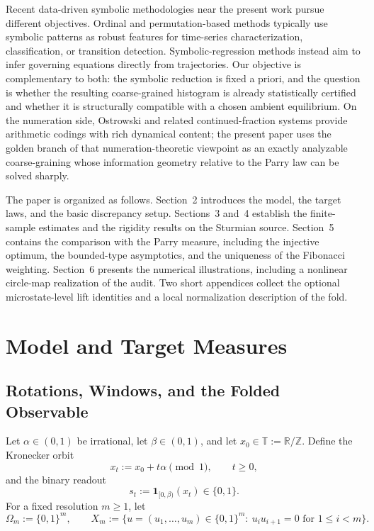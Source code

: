 \documentclass[11pt,letterpaper]{article}
\numberwithin{equation}{section}
\theoremstyle{plain}
\theoremstyle{definition}
\theoremstyle{remark}
\newcommand{\TT}{\mathbb{T}}
\begin{document}
Recent data-driven symbolic methodologies near the present work pursue
different objectives. Ordinal and permutation-based methods
\cite{Amigo2023OrdinalMethods} typically use symbolic patterns as robust
features for time-series characterization, classification, or transition
detection. Symbolic-regression methods \cite{dAscoli2024ODEFormer} instead aim
to infer governing equations directly from trajectories. Our objective is
complementary to both: the symbolic reduction is fixed a priori, and the
question is whether the resulting coarse-grained histogram is already
statistically certified and whether it is structurally compatible with a chosen
ambient equilibrium. On the numeration side, Ostrowski and related
continued-fraction systems \cite{Berthe2001Ostrowski,
BaranwalaSchaefferShallit2021OstrowskiAutomatic} provide arithmetic codings
with rich dynamical content; the present paper uses the golden branch of that
numeration-theoretic viewpoint as an exactly analyzable coarse-graining whose
information geometry relative to the Parry law can be solved sharply.

The paper is organized as follows. Section~2 introduces the model, the target
laws, and the basic discrepancy setup. Sections~3 and~4 establish the
finite-sample estimates and the rigidity results on the Sturmian source.
Section~5 contains the comparison with the Parry measure, including the
injective optimum, the bounded-type asymptotics, and the uniqueness of the
Fibonacci weighting. Section~6 presents the numerical illustrations, including
a nonlinear circle-map realization of the audit. Two short appendices collect
the optional microstate-level lift identities and a local normalization
description of the fold.

\section{Model and Target Measures}

\subsection{Rotations, Windows, and the Folded Observable}

Let $\alpha\in(0,1)$ be irrational, let $\beta\in(0,1)$, and let
$x_0\in\TT:=\mathbb{R}/\mathbb{Z}$.  Define the Kronecker orbit
\[
x_t:=x_0+t\alpha \pmod 1,\qquad t\ge 0,
\]
and the binary readout
\[
s_t:=\mathbf{1}_{[0,\beta)}(x_t)\in\{0,1\}.
\]
For a fixed resolution $m\ge 1$, let
\[
\Omega_m:=\{0,1\}^m,\qquad
X_m:=\{u=(u_1,\dots,u_m)\in\{0,1\}^m:\ u_i u_{i+1}=0\text{ for }1\le i<m\}.
\]
\end{document}
